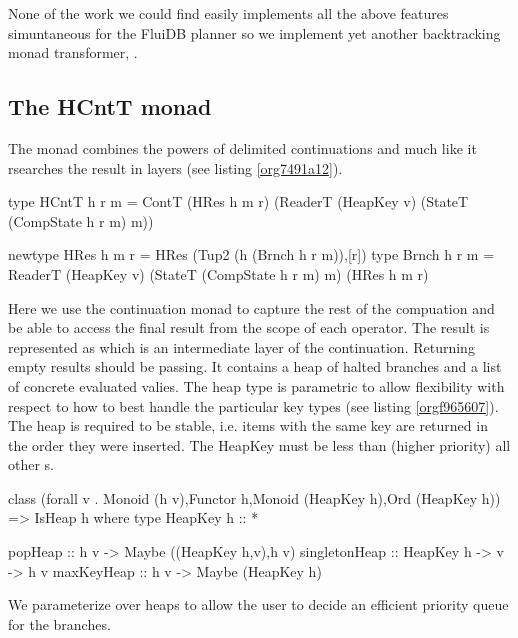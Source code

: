 None of the work we could find easily implements all the above
features simuntaneous for the FluiDB planner so we implement yet
another backtracking monad transformer, .


\subsection{The HCntT monad}
\label{sec:org43bf21e}
The  monad combines the powers of delimited continuations and
much like \cite{kidneyAlgebrasWeightedSearch2021} it rsearches the
result in layers (see listing \ref{org7491a12}).

\begin{code}
\begin{haskellcode}
type HCntT h r m = ContT (HRes h m r)
  (ReaderT (HeapKey v)
   (StateT (CompState h r m) m))

newtype HRes h m r = HRes (Tup2 (h (Brnch h r m)),[r])
type Brnch h r m = ReaderT (HeapKey v)
  (StateT (CompState h r m) m) (HRes h m r)
\end{haskellcode}
\caption{\label{org7491a12}}
\end{code}

Here we use the continuation monad to capture the rest of the
compuation and be able to access the final result from the scope of
each operator. The result is represented as  which is an
intermediate layer of the continuation. Returning empty results should
be passing. It contains a heap of halted branches and a list of
concrete evaluated valies. The heap type is parametric to allow
flexibility with respect to how to best handle the particular key
types (see listing \ref{orgf965607}). The heap is required to be stable,
i.e. items with the same key are returned in the order they were
inserted. The HeapKey  must be less than (higher priority) all
other  s.

\begin{code}
\begin{haskellcode}
class (forall v . Monoid (h v),Functor h,Monoid (HeapKey h),Ord (HeapKey h))
  => IsHeap h where
  type HeapKey h :: *

  popHeap :: h v -> Maybe ((HeapKey h,v),h v)
  singletonHeap :: HeapKey h -> v -> h v
  maxKeyHeap :: h v -> Maybe (HeapKey h)
\end{haskellcode}
\caption{\label{orgf965607}We parameterize over heaps to allow the user to decide an efficient priority queue for the branches.}
\end{code}

